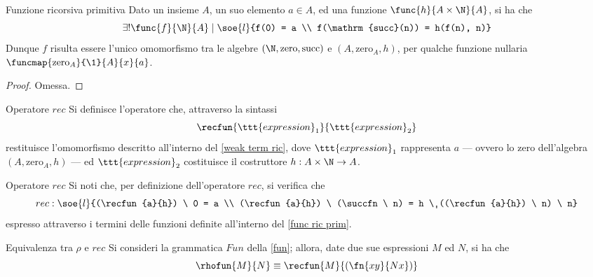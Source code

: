 \documentclass[a4paper, 12pt]{report}
\begin{document}
    \begin{framedlem}[label={func ric prim}]{Funzione ricorsiva primitiva}
        Dato un insieme $A$, un suo elemento $a \in A$, ed una funzione $\func{h}{A \times \N}{A}$, si ha che $$\exists ! \func{f}{\N}{A} \mid \soe{l}{f(0) = a \\ f(\mathrm{succ}(n)) = h(f(n), n)}$$ Dunque $f$ risulta essere l'unico omomorfismo tra le algebre $(\N, \mathrm{zero}, \mathrm{succ})$ e $(A, \mathrm{zero}_A,h )$, per qualche funzione nullaria $\funcmap{\mathrm{zero}_A}{\1}{A}{x}{a}$.
    \end{framedlem}

    \begin{proof}
        Omessa.
    \end{proof}

    \begin{frameddefn}{Operatore $rec$}
        Si definisce  l'operatore che, attraverso la sintassi $$\recfun{\ttt{expression}_1}{\ttt{expression}_2}$$ restituisce l'omomorfismo descritto all'interno del \cref{weak term ric}, dove $\ttt{expression}_1$ rappresenta $a$ --- ovvero lo zero dell'algebra $(A,\mathrm{zero}_A, h)$ --- ed $\ttt{expression}_2$ costituisce il costruttore $h: A \times \N \to A$.
    \end{frameddefn}

    \begin{framedobs}[label={rec obs}]{Operatore $rec$}
        Si noti che, per definizione dell'operatore $rec$, si verifica che $$rec: \soe{l}{(\recfun{a}{h}) \ 0 = a \\ (\recfun{a}{h}) \ (\succfn \ n) = h \ ((\recfun{a}{h}) \ n) \ n}$$ espresso attraverso i termini delle funzioni definite all'interno del \cref{func ric prim}.
    \end{framedobs}

    \begin{framedprop}{Equivalenza tra $\rho$ e $rec$}
        Si consideri la grammatica $Fun$ della \cref{fun}; allora, date due sue espressioni $M$ ed $N$, si ha che $$\rhofun{M}{N} \equiv \recfun{M}{(\fn{xy}{Nx})}$$
    \end{framedprop}

\end{document}
